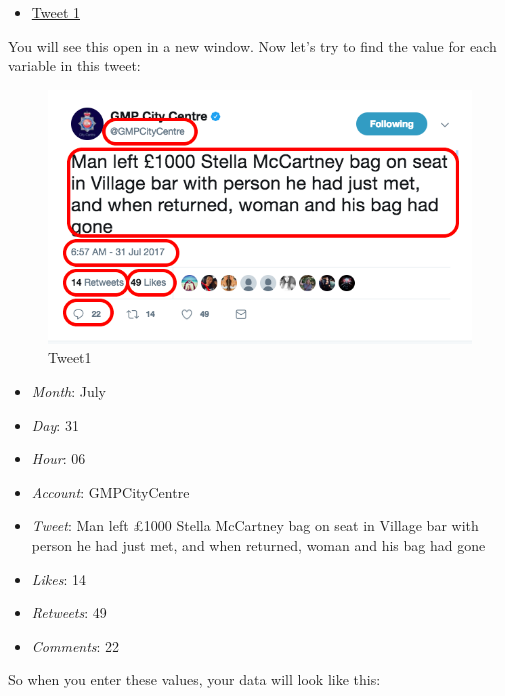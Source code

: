 \documentclass[]{book}
\providecommand{\tightlist}{%
  \setlength{\itemsep}{0pt}\setlength{\parskip}{0pt}}
\theoremstyle{definition}
\theoremstyle{definition}
\theoremstyle{definition}
\theoremstyle{remark}
\begin{document}
\begin{itemize}
\tightlist
\item
  \href{https://twitter.com/GMPCityCentre/status/891900693585506304}{Tweet
  1}
\end{itemize}

You will see this open in a new window. Now let's try to find the value
for each variable in this tweet:

\begin{figure}
\centering
\includegraphics{imgs/tweet1.png}
\caption{Tweet1}
\end{figure}

\begin{itemize}
\tightlist
\item
  \emph{Month}: July
\item
  \emph{Day}: 31
\item
  \emph{Hour}: 06
\item
  \emph{Account}: GMPCityCentre
\item
  \emph{Tweet}: Man left £1000 Stella McCartney bag on seat in Village
  bar with person he had just met, and when returned, woman and his bag
  had gone
\item
  \emph{Likes}: 14
\item
  \emph{Retweets}: 49
\item
  \emph{Comments}: 22
\end{itemize}

So when you enter these values, your data will look like this:
\end{document}
